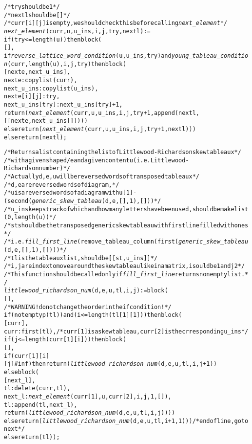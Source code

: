 \begin{alltt}
/* try should be 1 */
/* nextl should be [] */
/* curr[i][j] is empty, we should check this before calling \emph{next\_element} */
\emph{next\_element} (curr, u, u\_ins, i, j, try, nextl) :=
if (try <= length (u)) then block (
  [],
  if \emph{reverse\_lattice\_word\_condition} (u, u\_ins, try) and \emph{young\_tableau\_condition} (curr, length (u), i, j, try) then block (
    [nexte, next\_u\_ins],
    nexte : copylist (curr),
    next\_u\_ins : copylist (u\_ins),
    nexte[i][j] : try,
    next\_u\_ins[try] : next\_u\_ins[try] + 1,
    return (\emph{next\_element} (curr, u, u\_ins, i, j, try + 1, append (nextl, [[nexte, next\_u\_ins]]))))
  else return (\emph{next\_element} (curr, u, u\_ins, i, j, try + 1, nextl)))
else return (nextl); 

/* Returns a list containing the list of Littlewood-Richardson skew tableaux */
/* with a given shape d/e and a given content u (i.e. Littlewood-Richardson number) */
/* Actually d,e,u will be reversed words of transposed tableaux */
/* d,e are reversed words of diagram, */
/* u is a reversed words of a diagram with u[1]-(second (\emph{generic\_skew\_tableau} (d, e, [], 1), [])) */
/* u\_ins keeps track of which and how many letters have been used, should be makelist (0, length (u)) */
/* st should be the transposed generic skew tableau with first line filled with ones */
/* i.e. \emph{fill\_first\_line} (remove\_tableau\_column (first (\emph{generic\_skew\_tableau} (d, e, [], 1), []))) */
/* tl is the tableaux list, should be [[st, u\_ins]] */
/* i,j are index to move around the skew tableau like in a matrix, i sould be 1 and j 2 */
/* This function should be called only if \emph{fill\_first\_line} returns non empty list. */
\emph{littlewood\_richardson\_num} (d, e, u, tl, i, j) := block (
  [],
  /* WARNING! do not change the order in the if condition! */
  if (not emptyp (tl)) and (i <= length (tl[1][1]))then block (
    [curr],
    curr : first (tl), /* curr[1] is a skew tableau, curr[2] is the crresponding u\_ins */
    if (j <= length (curr[1][i])) then block (
      [],
      if (curr[1][i][j] # inf) then return (\emph{littlewood\_richardson\_num} (d, e, u, tl, i, j+1))
      else block (
        [next\_l],
        tl : delete (curr, tl),
        next\_l : \emph{next\_element} (curr[1], u, curr[2], i, j, 1, []),
        tl : append (tl, next\_l),
        return (\emph{littlewood\_richardson\_num} (d, e, u, tl, i, j))))
    else return (\emph{littlewood\_richardson\_num} (d, e, u, tl, i+1, 1))) /* end of line, go to next */
  else return (tl));
\end{alltt}
